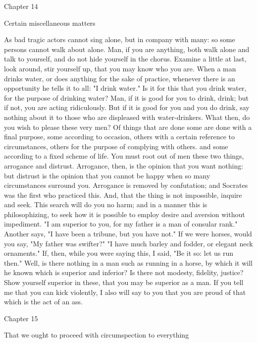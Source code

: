 \documentclass[a4paper]{article}
\begin{document}
Chapter 14

Certain miscellaneous matters

    As bad tragic actors cannot sing alone, but in company with many: so some
persons cannot walk about alone. Man, if you are anything, both walk alone and
talk to yourself, and do not hide yourself in the chorus. Examine a little at
last, look around, stir yourself up, that you may know who you are.
    When a man drinks water, or does anything for the sake of practice,
whenever there is an opportunity he tells it to all: "I drink water." Is it for
this that you drink water, for the purpose of drinking water? Man, if it is
good for you to drink, drink; but if not, you are acting ridiculously. But if
it is good for you and you do drink, say nothing about it to those who are
displeased with water-drinkers. What then, do you wish to please these very
men?
    Of things that are done some are done with a final purpose, some according
to occasion, others with a certain reference to circumstances, others for the
purpose of complying with others. and some according to a fixed scheme of life.
    You must root out of men these two things, arrogance and distrust.
Arrogance, then, is the opinion that you want nothing: but distrust is the
opinion that you cannot be happy when so many circumstances surround you.
Arrogance is removed by confutation; and Socrates was the first who practiced
this. And, that the thing is not impossible, inquire and seek. This search will
do you no harm; and in a manner this is philosophizing, to seek how it is
possible to employ desire and aversion without impediment.
    "I am superior to you, for my father is a man of consular rank." Another
says, "I have been a tribune, but you have not." If we were horses, would you
say, "My father was swifter?" "I have much barley and fodder, or elegant neck
ornaments." If, then, while you were saying this, I said, "Be it so: let us run
then." Well, is there nothing in a man such as running in a horse, by which it
will he known which is superior and inferior? Is there not modesty, fidelity,
justice? Show yourself superior in these, that you may be superior as a man. If
you tell me that you can kick violently, I also will say to you that you are
proud of that which is the act of an ass.

Chapter 15

That we ought to proceed with circumspection to everything
\end{document}
